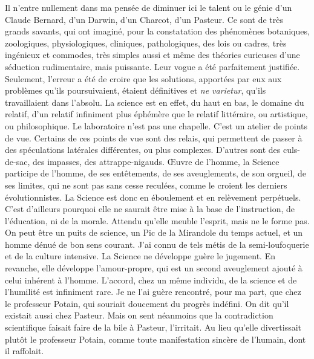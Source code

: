 \documentclass[french,twoside]{book} %
\begin{document}
Il n’entre nullement dans ma pensée de diminuer ici le talent ou le génie d’un Claude Bernard, d’un Darwin, d’un Charcot, d’un Pasteur. Ce sont de très grands savants, qui ont imaginé, pour la constatation des phénomènes botaniques, zoologiques, physiologiques, cliniques, pathologiques, des lois ou cadres, très ingénieux et commodes, très simples aussi et même des théories curieuses d’une séduction rudimentaire, mais puissante. Leur vogue a été parfaitement justifiée. Seulement, l’erreur a été de croire que les solutions, apportées par eux aux problèmes qu’ils poursuivaient, étaient définitives et {\itshape ne varietur}, qu’ils travaillaient dans l’absolu. La science est en effet, du haut en bas, le domaine du relatif, d’un relatif infiniment plus éphémère que le relatif littéraire, ou artistique, ou philosophique. Le laboratoire n’est pas une chapelle. C’est un atelier de points de vue. Certains de ces points de vue sont des relais, qui permettent de passer à des spéculations latérales différentes, ou plus complexes. D’autres sont des culs-de-sac, des impasses, des attrappe-nigauds. Œuvre de l’homme, la Science participe de l’homme, de ses entêtements, de ses aveuglements, de son orgueil, de ses limites, qui ne sont pas sans cesse reculées, comme le croient les derniers évolutionnistes. La Science est donc en éboulement et en relèvement perpétuels. C’est d’ailleurs pourquoi elle ne saurait être mise à la base de l’instruction, de l’éducation, ni de la morale. Attendu qu’elle meuble l’esprit, mais ne le forme pas. On peut être un puits de science, un Pic de la Mirandole du temps actuel, et un homme dénué de bon sens courant. J’ai connu de tels métis de la semi-loufoquerie et de la culture intensive. La Science ne développe guère le jugement. En revanche, elle développe l’amour-propre, qui est un second aveuglement ajouté à celui inhérent à l’homme. L’accord, chez un même individu, de la science et de l’humilité est infiniment rare. Je ne l’ai guère rencontré, pour ma part, que chez le professeur Potain, qui souriait doucement du progrès indéfini. On dit qu’il existait aussi chez Pasteur. Mais on sent néanmoins que la contradiction scientifique faisait faire de la bile à Pasteur, l’irritait. Au lieu qu’elle divertissait plutôt le professeur Potain, comme toute manifestation sincère de l’humain, dont il raffolait.\par
\end{document}
